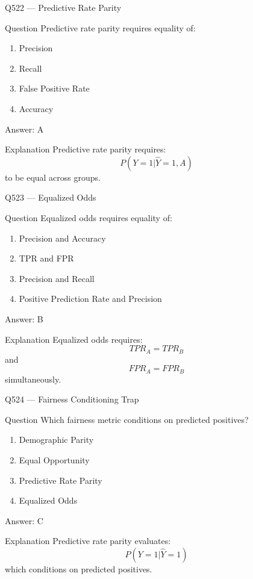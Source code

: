 \documentclass[aspectratio=169,8pt]{beamer}
\begin{document}
\begin{frame}{Q522 --- Predictive Rate Parity}
	\begin{block}{Question}
		Predictive rate parity requires equality of:
		\begin{enumerate}
			\item Precision
			\item Recall
			\item False Positive Rate
			\item Accuracy
		\end{enumerate}
	\end{block}
	\begin{exampleblock}{Answer: A}\end{exampleblock}
	\begin{block}{Explanation}
		Predictive rate parity requires:
		\[
		P(Y=1|\hat{Y}=1,A)
		\]
		to be equal across groups.
	\end{block}
\end{frame}

\begin{frame}{Q523 --- Equalized Odds}
	\begin{block}{Question}
		Equalized odds requires equality of:
		\begin{enumerate}
			\item Precision and Accuracy
			\item TPR and FPR
			\item Precision and Recall
			\item Positive Prediction Rate and Precision
		\end{enumerate}
	\end{block}
	\begin{exampleblock}{Answer: B}\end{exampleblock}
	\begin{block}{Explanation}
		Equalized odds requires:
		\[
		TPR_A = TPR_B
		\]
		and
		\[
		FPR_A = FPR_B
		\]
		simultaneously.
	\end{block}
\end{frame}

\begin{frame}{Q524 --- Fairness Conditioning Trap}
	\begin{block}{Question}
		Which fairness metric conditions on predicted positives?
		\begin{enumerate}
			\item Demographic Parity
			\item Equal Opportunity
			\item Predictive Rate Parity
			\item Equalized Odds
		\end{enumerate}
	\end{block}
	\begin{exampleblock}{Answer: C}\end{exampleblock}
	\begin{block}{Explanation}
		Predictive rate parity evaluates:
		\[
		P(Y=1|\hat{Y}=1)
		\]
		which conditions on predicted positives.
	\end{block}
\end{frame}
\end{document}
